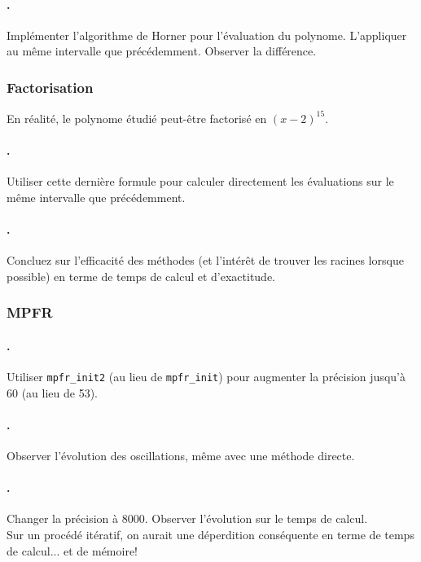 \documentclass[a4paper,11pt]{exam}
\begin{document}
\paragraph{\theenumii.} Implémenter l'algorithme de Horner pour l'évaluation du polynome. L'appliquer au même intervalle que précédemment. Observer la différence.
\setcounter{enumii}{1}
\subsubsection{Factorisation}
En réalité, le polynome étudié peut-être factorisé en $(x-2)^{15}$.
\paragraph{\theenumii.}Utiliser cette dernière formule pour calculer directement les évaluations sur le même intervalle que précédemment.
\paragraph{\theenumii.}Concluez sur l'efficacité des méthodes (et l'intérêt de trouver les racines lorsque possible) en terme de temps de calcul et d'exactitude.

\setcounter{enumii}{1}
\subsubsection{MPFR}
\paragraph{\theenumii.}Utiliser \verb=mpfr_init2= (au lieu de \verb=mpfr_init=) pour augmenter la précision jusqu'à 60 (au lieu de 53).
\paragraph{\theenumii.}Observer l'évolution des oscillations, même avec une méthode directe. 
\paragraph{\theenumii.}Changer la précision à 8000. Observer l'évolution sur le temps de calcul. \\
Sur un procédé itératif, on aurait une déperdition conséquente en terme de temps de calcul... et de mémoire!
\end{document}
